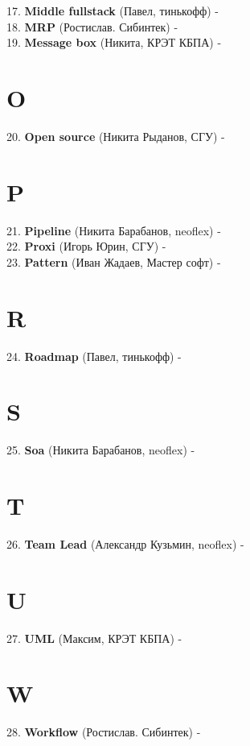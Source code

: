 \documentclass[14 pt]{extarticle}
\begin{document}
    17. \textbf{Middle fullstack} (Павел, тинькофф) -  \\
    
    18. \textbf{MRP} (Ростислав. Сибинтек) - \\
    
    19. \textbf{Message box} (Никита, КРЭТ КБПА) - \\
    
\section*{O}
    20. \textbf{Open source} (Никита Рыданов, СГУ) - \\
    
\section*{P}
    21. \textbf{Pipeline} (Никита Барабанов, neoflex) - \\
    
    22. \textbf{Proxi} (Игорь Юрин, СГУ) - \\
    
    23. \textbf{Pattern} (Иван Жадаев, Мастер софт) -  \\
    
\section*{R}
    24. \textbf{Roadmap} (Павел, тинькофф) -  \\
    
\section*{S}
    25. \textbf{Soa} (Никита Барабанов, neoflex) - \\
    
\section*{T}
    26. \textbf{Team Lead} (Александр Кузьмин, neoflex) - \\
    
\section*{U}
    27. \textbf{UML} (Максим, КРЭТ КБПА) - \\

\section*{W}
    28. \textbf{Workflow} (Ростислав. Сибинтек) - \\
\end{document}
